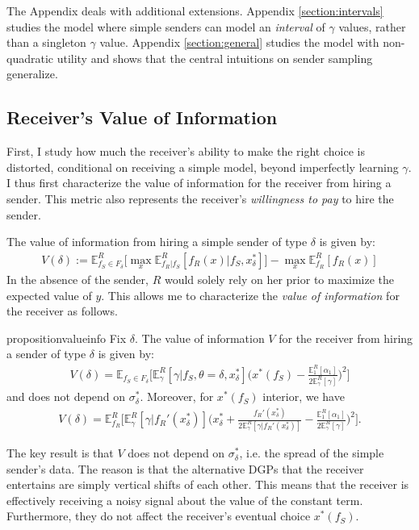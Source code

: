 \documentclass[11pt,dvipsnames]{article}
\begin{document}
The Appendix deals with additional extensions.
Appendix \ref{section:intervals} studies the model where simple senders can model an \emph{interval} of $\gamma$ values, rather than a singleton $\gamma$ value.
Appendix \ref{section:general} studies the model with non-quadratic utility and shows that the central intuitions on sender sampling generalize.


\subsection{Receiver's Value of Information}
First, I study how much the receiver's ability to make the right choice is distorted, conditional on receiving a simple model, beyond imperfectly learning $\gamma$.
I thus first characterize the value of information for the receiver from hiring a sender.
This metric also represents the receiver's \emph{willingness to pay} to hire the sender.

The value of information from hiring a simple sender of type $\delta$ is given by:
\begin{align}
V(\delta) :=\mathbb{E}_{f_S \in F_\delta}^R\big[\max_x \mathbb{E}_{f_R|f_S}^R	 [f_R(x)|f_S,x_\delta^*]\big]
-\max_x \mathbb{E}_{f_R}^R[f_R(x)]
\label{eq:valinfo}
\end{align}
In the absence of the sender, $R$ would solely rely on her prior to maximize the expected value of $y$.
This allows me to characterize the \emph{value of information} for the receiver as follows.
\begin{restatable}{proposition}{valueinfo}
Fix $\delta$.
The value of information $V$ for the receiver from hiring a sender of type $\delta$ is given by:
\begin{align*}
V(\delta) = \mathbb{E}_{f_S \in F_\delta}\bigg[\mathbb{E}_{\gamma}^R[\gamma|f_S,\theta=\delta,x_\delta^*]\bigg(x^*(f_S)-\frac{\mathbb{E}_1^R[\alpha_1]}{2\mathbb{E}_\gamma^R[\gamma]}\bigg)^2\bigg]
\end{align*}	
and does not depend on $\sigma_\delta^*$.
Moreover, for $x^*(f_S)$ interior, we have
\begin{align*}
V(\delta) = \mathbb{E}_{f_R}^R\Bigg[\mathbb{E}_\gamma^R[\gamma|f_R'(x_\delta^*)]\bigg(x_\delta^*+\frac{f_R'(x_\delta^*)}{2\mathbb{E}_\gamma^R[\gamma|f_R'(x_\delta^*)]}-\frac{\mathbb{E}_1^R[\alpha_1]}{2\mathbb{E}_\gamma^R[\gamma]}\bigg)^2\Bigg].
\end{align*}
\label{prop:valueinfo}
\end{restatable}
The key result is that $V$ does not depend on $\sigma_\delta^*$, i.e. the spread of the simple sender's data.
The reason is that the alternative DGPs that the receiver entertains are simply vertical shifts of each other.
This means that the receiver is effectively receiving a noisy signal about the value of the constant term.
Furthermore, they do not affect the receiver's eventual choice $x^*(f_S)$.
\end{document}
